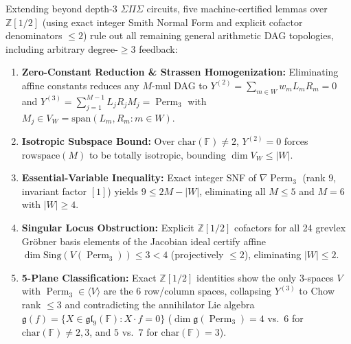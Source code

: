 \documentclass[11pt,a4paper]{article}
\newcommand{\Perm}{\operatorname{Perm}}
\begin{document}
Extending beyond depth-3 $\Sigma\Pi\Sigma$ circuits, five machine-certified lemmas over $\mathbb{Z}[1/2]$ (using exact integer Smith Normal Form and explicit cofactor denominators $\le 2$) rule out all remaining general arithmetic DAG topologies, including arbitrary degree-$\ge 3$ feedback:
\begin{enumerate}[leftmargin=*]
    \item \textbf{Zero-Constant Reduction \& Strassen Homogenization:} Eliminating affine constants reduces any $M$-mul DAG to $Y^{(2)} = \sum_{m \in W} w_m L_m R_m = 0$ and $Y^{(3)} = \sum_{j=1}^{M-1} L_j R_j M_j = \Perm_3$ with $M_j \in V_W = \mathrm{span}(L_m, R_m : m \in W)$.
    \item \textbf{Isotropic Subspace Bound:} Over $\mathrm{char}(\mathbb{F}) \neq 2$, $Y^{(2)} = 0$ forces $\mathrm{rowspace}(M)$ to be totally isotropic, bounding $\dim V_W \le |W|$.
    \item \textbf{Essential-Variable Inequality:} Exact integer SNF of $\nabla \Perm_3$ (rank $9$, invariant factor $[1]$) yields $9 \le 2M - |W|$, eliminating all $M \le 5$ and $M = 6$ with $|W| \ge 4$.
    \item \textbf{Singular Locus Obstruction:} Explicit $\mathbb{Z}[1/2]$ cofactors for all 24 grevlex Gr\"obner basis elements of the Jacobian ideal certify affine $\dim \mathrm{Sing}(V(\Perm_3)) \le 3 < 4$ (projectively $\le 2$), eliminating $|W| \le 2$.
    \item \textbf{5-Plane Classification:} Exact $\mathbb{Z}[1/2]$ identities show the only 3-spaces $V$ with $\Perm_3 \in \langle V \rangle$ are the 6 row/column spaces, collapsing $Y^{(3)}$ to Chow rank $\le 3$ and contradicting the annihilator Lie algebra $\mathfrak{g}(f) = \{X \in \mathfrak{gl}_9(\mathbb{F}) : X \cdot f = 0\}$ ($\dim \mathfrak{g}(\Perm_3) = 4$ vs.\ $6$ for $\mathrm{char}(\mathbb{F}) \neq 2,3$, and $5$ vs.\ $7$ for $\mathrm{char}(\mathbb{F}) = 3$).
\end{enumerate}
\end{document}
